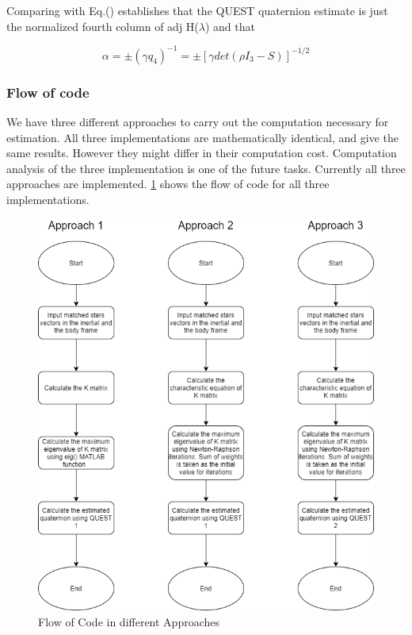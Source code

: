 \documentclass[../../main.tex]{subfiles}
\begin{document}
{{{Comparing with Eq.() establishes that the QUEST quaternion estimate is just the normalized fourth column of adj H($\lambda$) and that

\begin{equation}
   \alpha = \pm (\gamma \hat{q}_{4})^{-1} = \pm [\gamma det(\rho I_{3} - S)]^{-1/2}
\end{equation}

}



\subsubsection{Flow of code}
{
We have three different approaches to carry out the computation necessary for estimation. All three implementations are mathematically identical, and give the same results. However they might differ in their computation cost. Computation analysis of the three implementation is one of the future tasks. Currently all three approaches are implemented. \ref{sec:esti_flow_of_code} shows the flow of code for all three implementations.
\begin{figure}
\centering
\includegraphics[scale=0.50]{Figures/GNC/estimation_flowchart.png}
\caption{Flow of Code in different Approaches}
\label{sec:esti_flow_of_code}
\end{figure}

}}}
\end{document}
